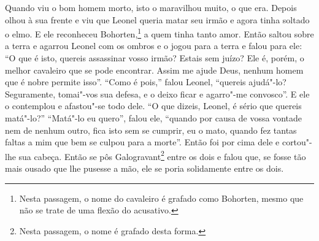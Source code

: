 Quando viu o bom homem morto, isto o maravilhou muito, o que era. Depois olhou
à sua frente e viu que Leonel queria matar seu irmão e agora tinha soltado o
elmo. E ele reconheceu Bohorten,\footnote{ Nesta passagem, o nome do cavaleiro é
grafado como Bohorten, mesmo que não se trate de uma flexão do acusativo.}  
a quem tinha tanto amor. Então saltou sobre a terra e agarrou
Leonel com os ombros e o jogou para a terra e falou para ele: “O que é isto,
quereis assassinar vosso irmão? Estais sem juízo? Ele é, porém, o melhor
cavaleiro que se pode encontrar. Assim me ajude Deus, nenhum homem que é nobre
permite isso”. “Como é pois,” falou Leonel, “quereis ajudá"-lo? Seguramente,
tomai"-vos sua defesa, e o deixo ficar e agarro"-me convosco”. E ele o contemplou
e afastou"-se todo dele. “O que dizeis, Leonel, é sério que quereis matá"-lo?”
“Matá"-lo eu quero”, falou ele, “quando por causa de vossa vontade nem de nenhum
outro, fica isto sem se cumprir, eu o mato, quando fez tantas faltas a mim que
bem se culpou para a morte”. Então foi por cima dele e cortou"-lhe sua cabeça.
Então se pôs Galogravant\footnote{ Nesta passagem, o nome é grafado desta forma.} 
entre os dois e falou que, se fosse tão mais ousado que lhe
pusesse a mão, ele se poria solidamente entre os dois.

